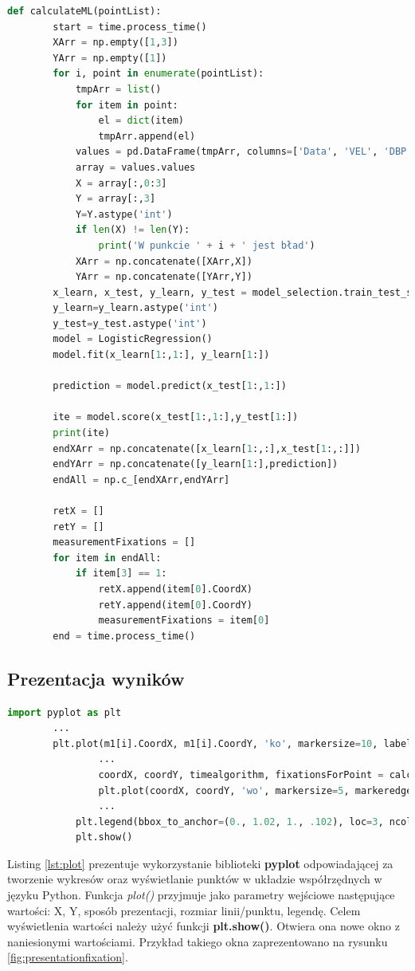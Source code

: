 \begin{lstlisting}[language=Python, caption=Algorytm wykorzystujący uczenie maszynowe, label={lst:mlalgorithm}]
def calculateML(pointList):
        start = time.process_time()
        XArr = np.empty([1,3])
        YArr = np.empty([1])
        for i, point in enumerate(pointList):
            tmpArr = list()
            for item in point:
                el = dict(item)
                tmpArr.append(el)
            values = pd.DataFrame(tmpArr, columns=['Data', 'VEL', 'DBP', 'FIX'])
            array = values.values
            X = array[:,0:3]
            Y = array[:,3]
            Y=Y.astype('int')
            if len(X) != len(Y):
                print('W punkcie ' + i + ' jest bład')
            XArr = np.concatenate([XArr,X])
            YArr = np.concatenate([YArr,Y])
        x_learn, x_test, y_learn, y_test = model_selection.train_test_split(XArr, YArr, test_size=0.8)
        y_learn=y_learn.astype('int')
        y_test=y_test.astype('int')
        model = LogisticRegression()
        model.fit(x_learn[1:,1:], y_learn[1:])
    
        prediction = model.predict(x_test[1:,1:])
        
        ite = model.score(x_test[1:,1:],y_test[1:])
        print(ite)
        endXArr = np.concatenate([x_learn[1:,:],x_test[1:,:]])
        endYArr = np.concatenate([y_learn[1:],prediction])
        endAll = np.c_[endXArr,endYArr]
    
        retX = []
        retY = []
        measurementFixations = []
        for item in endAll:
            if item[3] == 1:
                retX.append(item[0].CoordX)
                retY.append(item[0].CoordY)
                measurementFixations = item[0]
        end = time.process_time()
\end{lstlisting}

\subsection{Prezentacja wyników}
\label{ssec:datashow}
\begin{lstlisting}[language=Python, caption=Wyświetlanie wyników, label={lst:plot}]
        import pyplot as plt
        ...
        plt.plot(m1[i].CoordX, m1[i].CoordY, 'ko', markersize=10, label='Eye-tracker points' if i == 0 else "")
                ...
                coordX, coordY, timealgorithm, fixationsForPoint = calculateIdtAlgorithm(m1)
                plt.plot(coordX, coordY, 'wo', markersize=5, markeredgecolor='r', label='Calculated fixations')
                ...
            plt.legend(bbox_to_anchor=(0., 1.02, 1., .102), loc=3, ncol=2, mode="expand", borderaxespad=0.)
            plt.show()
\end{lstlisting}
Listing \ref{lst:plot} prezentuje wykorzystanie biblioteki \textbf{pyplot} odpowiadającej za tworzenie wykresów oraz wyświetlanie punktów w układzie współrzędnych w języku Python. Funkcja \emph{plot()} przyjmuje jako parametry wejściowe następujące wartości: X, Y, sposób prezentacji, rozmiar linii/punktu, legendę. Celem wyświetlenia wartości należy użyć funkcji \textbf{plt.show()}. Otwiera ona nowe okno z naniesionymi wartościami. Przykład takiego okna zaprezentowano na rysunku \ref{fig:presentationfixation}.

